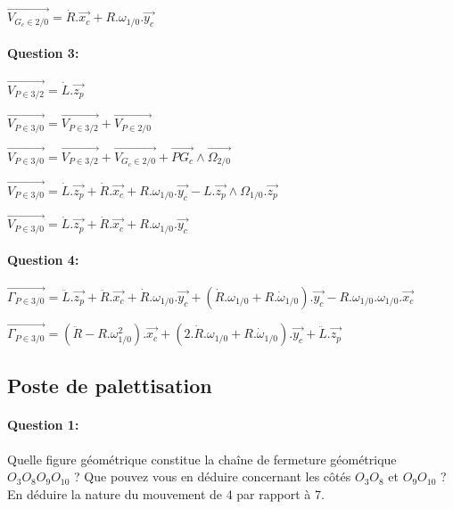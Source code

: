 $\overrightarrow{V_{G_c\in 2/0}}=\dot{R}.\overrightarrow{x_c}+R.\omega_{1/0}.\overrightarrow{y_c}$

\paragraph{Question 3:} 

$\overrightarrow{V_{P\in 3/2}}=\dot{L}.\overrightarrow{z_p}$

$\overrightarrow{V_{P\in 3/0}}=\overrightarrow{V_{P\in 3/2}}+\overrightarrow{V_{P\in 2/0}}$

$\overrightarrow{V_{P\in 3/0}}=\overrightarrow{V_{P\in 3/2}}+\overrightarrow{V_{G_c\in 2/0}}+\overrightarrow{PG_c}\wedge \overrightarrow{\Omega_{2/0}}$

$\overrightarrow{V_{P\in 3/0}}=\dot{L}.\overrightarrow{z_p}+\dot{R}.\overrightarrow{x_c}+R.\omega_{1/0}.\overrightarrow{y_c}-L.\overrightarrow{z_p}\wedge \Omega_{1/0}.\overrightarrow{z_p}$

$\overrightarrow{V_{P\in 3/0}}=\dot{L}.\overrightarrow{z_p}+\dot{R}.\overrightarrow{x_c}+R.\omega_{1/0}.\overrightarrow{y_c}$

\paragraph{Question 4:} 

$\overrightarrow{\Gamma_{P\in 3/0}}=\ddot{L}.\overrightarrow{z_p}+\ddot{R}.\overrightarrow{x_c}+\dot{R}.\omega_{1/0}.\overrightarrow{y_c}+(\dot{R}.\omega_{1/0}+R.\dot{\omega}_{1/0}).\overrightarrow{y_c}-R.\omega_{1/0}.\omega_{1/0}.\overrightarrow{x_c}$

$\overrightarrow{\Gamma_{P\in 3/0}}=(\ddot{R}-R.\omega_{1/0}^2).\overrightarrow{x_c}+(2.\dot{R}.\omega_{1/0}+R.\dot{\omega}_{1/0}).\overrightarrow{y_c}+\ddot{L}.\overrightarrow{z_p}$

\subsection{Poste de palettisation}

\paragraph{Question 1:} Quelle figure géométrique constitue la chaîne de fermeture géométrique $O_3O_8O_9O_{10}$ ? Que pouvez vous en déduire concernant les côtés $O_3O_8$ et $O_9O_{10}$ ? En déduire la nature du mouvement de 4 par rapport à 7.

